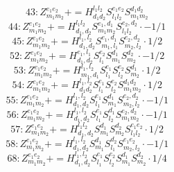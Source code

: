 \documentclass[letterpaper,10pt,fleqn,leqno,onecolumn]{article}
\begin{document}
\begin{equation} \;\;\;\;\;\;  43: Z^{e_{1}e_{2}}_{m_{1}m_{2}}+=H^{l_{1}l_{2}}_{d_{1}d_{2}}S^{e_{1}e_{2}}_{l_{1}l_{2}}S^{d_{1}d_{2}}_{m_{1}m_{2}} \end{equation}
\begin{equation} \;\;\;\;\;\;  44: Z^{e_{1}e_{2}}_{m_{1}m_{2}}+=H^{l_{1}l_{2}}_{d_{1},d_{2}}S^{e_{1},d_{1}}_{m_{1}m_{2}}S^{e_{2},d_{2}}_{l_{1}l_{2}}\cdot -1/1 \end{equation}
\begin{equation} \;\;\;\;\;\;  45: Z^{e_{1}e_{2}}_{m_{1}m_{2}}+=H^{l_{1},l_{2}}_{d_{1},d_{2}}S^{e_{1},d_{1}}_{m_{1},l_{1}}S^{e_{2},d_{2}}_{m_{2},l_{2}}\cdot 1/2 \end{equation}
\begin{equation} \;\;\;\;\;\;  52: Z^{e_{1}e_{2}}_{m_{1}m_{2}}+=H^{e_{1},l_{1}}_{d_{1},d_{2}}S^{e_{2}}_{l_{1}}S^{d_{1}}_{m_{1}}S^{d_{2}}_{m_{2}}\cdot -1/2 \end{equation}
\begin{equation} \;\;\;\;\;\;  53: Z^{e_{1}e_{2}}_{m_{1}m_{2}}+=H^{l_{1},l_{2}}_{m_{1},d_{1}}S^{e_{1}}_{l_{1}}S^{e_{2}}_{l_{2}}S^{d_{1}}_{m_{2}}\cdot 1/2 \end{equation}
\begin{equation} \;\;\;\;\;\;  54: Z^{e_{1}e_{2}}_{m_{1}m_{2}}+=H^{l_{1},l_{2}}_{d_{1}d_{2}}S^{e_{1}}_{l_{1}}S^{e_{2}}_{l_{2}}S^{d_{1}d_{2}}_{m_{1}m_{2}}\cdot 1/2 \end{equation}
\begin{equation} \;\;\;\;\;\;  55: Z^{e_{1}e_{2}}_{m_{1}m_{2}}+=H^{l_{1},l_{2}}_{d_{1},d_{2}}S^{e_{1}}_{l_{1}}S^{d_{1}}_{m_{1}}S^{e_{2},d_{2}}_{m_{2},l_{2}}\cdot -1/1 \end{equation}
\begin{equation} \;\;\;\;\;\;  56: Z^{e_{1}e_{2}}_{m_{1}m_{2}}+=H^{l_{1},l_{2}}_{d_{1},d_{2}}S^{e_{1}}_{l_{1}}S^{d_{1}}_{l_{2}}S^{e_{2},d_{2}}_{m_{1}m_{2}}\cdot -1/1 \end{equation}
\begin{equation} \;\;\;\;\;\;  57: Z^{e_{1}e_{2}}_{m_{1}m_{2}}+=H^{l_{1}l_{2}}_{d_{1},d_{2}}S^{d_{1}}_{m_{1}}S^{d_{2}}_{m_{2}}S^{e_{1}e_{2}}_{l_{1}l_{2}}\cdot 1/2 \end{equation}
\begin{equation} \;\;\;\;\;\;  58: Z^{e_{1}e_{2}}_{m_{1}m_{2}}+=H^{l_{1},l_{2}}_{d_{1},d_{2}}S^{d_{1}}_{m_{1}}S^{d_{2}}_{l_{1}}S^{e_{1}e_{2}}_{m_{2},l_{2}}\cdot -1/1 \end{equation}
\begin{equation} \;\;\;\;\;\;  68: Z^{e_{1}e_{2}}_{m_{1}m_{2}}+=H^{l_{1},l_{2}}_{d_{1},d_{2}}S^{e_{1}}_{l_{1}}S^{e_{2}}_{l_{2}}S^{d_{1}}_{m_{1}}S^{d_{2}}_{m_{2}}\cdot 1/4 \end{equation}
\end{document}
